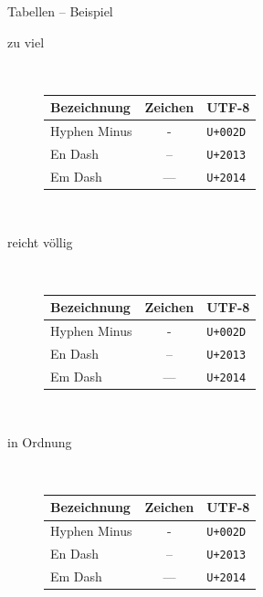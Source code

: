 \documentclass[ngerman,draft, usepdftitle=true]{beamer}
\newcommand*{\code}[1]{\texttt{#1}}
\begin{document}
\begin{frame}{Tabellen – Beispiel}
  \begin{description}
  \item[zu viel]~
    \parbox[t]{.5\textwidth}{
      \fontsize{8pt}{10.4pt}\selectfont
      \begin{tabular}{|l|c|l|}
        \hline
        Bezeichnung & Zeichen & UTF-8\\\hline
        Hyphen Minus & - & \code{U+002D}\\\hline
        En Dash & – & \code{U+2013}\\\hline
        Em Dash & --- & \code{U+2014}\\\hline
      \end{tabular}
      \\[\baselineskip]\mbox{}}

  \item[reicht völlig]~
    \parbox[t]{.5\textwidth}{
      \fontsize{8pt}{10.4pt}\selectfont
      \begin{tabular}{lcl}
        \toprule
        Bezeichnung & Zeichen & UTF-8\\\midrule[\heavyrulewidth]
        Hyphen Minus & - & \code{U+002D}\\
        En Dash & – & \code{U+2013}\\
        Em Dash & --- & \code{U+2014}\\\bottomrule
      \end{tabular}
      \\[\baselineskip]\mbox{}}

  \item[in Ordnung]~
    \parbox[t]{.5\textwidth}{
      \fontsize{8pt}{10.4pt}\selectfont
      \begin{tabular}{lcl}
        \toprule
        Bezeichnung & Zeichen & UTF-8\\\midrule[\heavyrulewidth]
        Hyphen Minus & - & \code{U+002D}\\\midrule
        En Dash & – & \code{U+2013}\\\midrule
        Em Dash & --- & \code{U+2014}\\\bottomrule
      \end{tabular}
      \\[\baselineskip]\mbox{}}
  \end{description}
\end{frame}
\end{document}

